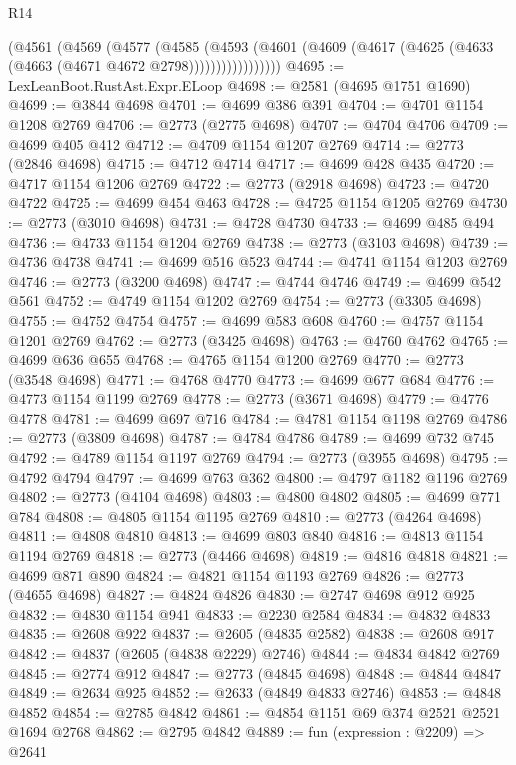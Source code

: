 \begin{lexlean}{R14}
\begin{coremodule}
              (@4561
                (@4569
                  (@4577
                    (@4585
                      (@4593
                        (@4601
                          (@4609 (@4617 (@4625 (@4633 (@4663 (@4671 @4672 @2798)))))))))))))))))
@4695 := LexLeanBoot.RustAst.Expr.ELoop
@4698 := @2581 (@4695 @1751 @1690)
@4699 := @3844 @4698
@4701 := @4699 @386 @391
@4704 := @4701 @1154 @1208 @2769
@4706 := @2773 (@2775 @4698)
@4707 := @4704 @4706
@4709 := @4699 @405 @412
@4712 := @4709 @1154 @1207 @2769
@4714 := @2773 (@2846 @4698)
@4715 := @4712 @4714
@4717 := @4699 @428 @435
@4720 := @4717 @1154 @1206 @2769
@4722 := @2773 (@2918 @4698)
@4723 := @4720 @4722
@4725 := @4699 @454 @463
@4728 := @4725 @1154 @1205 @2769
@4730 := @2773 (@3010 @4698)
@4731 := @4728 @4730
@4733 := @4699 @485 @494
@4736 := @4733 @1154 @1204 @2769
@4738 := @2773 (@3103 @4698)
@4739 := @4736 @4738
@4741 := @4699 @516 @523
@4744 := @4741 @1154 @1203 @2769
@4746 := @2773 (@3200 @4698)
@4747 := @4744 @4746
@4749 := @4699 @542 @561
@4752 := @4749 @1154 @1202 @2769
@4754 := @2773 (@3305 @4698)
@4755 := @4752 @4754
@4757 := @4699 @583 @608
@4760 := @4757 @1154 @1201 @2769
@4762 := @2773 (@3425 @4698)
@4763 := @4760 @4762
@4765 := @4699 @636 @655
@4768 := @4765 @1154 @1200 @2769
@4770 := @2773 (@3548 @4698)
@4771 := @4768 @4770
@4773 := @4699 @677 @684
@4776 := @4773 @1154 @1199 @2769
@4778 := @2773 (@3671 @4698)
@4779 := @4776 @4778
@4781 := @4699 @697 @716
@4784 := @4781 @1154 @1198 @2769
@4786 := @2773 (@3809 @4698)
@4787 := @4784 @4786
@4789 := @4699 @732 @745
@4792 := @4789 @1154 @1197 @2769
@4794 := @2773 (@3955 @4698)
@4795 := @4792 @4794
@4797 := @4699 @763 @362
@4800 := @4797 @1182 @1196 @2769
@4802 := @2773 (@4104 @4698)
@4803 := @4800 @4802
@4805 := @4699 @771 @784
@4808 := @4805 @1154 @1195 @2769
@4810 := @2773 (@4264 @4698)
@4811 := @4808 @4810
@4813 := @4699 @803 @840
@4816 := @4813 @1154 @1194 @2769
@4818 := @2773 (@4466 @4698)
@4819 := @4816 @4818
@4821 := @4699 @871 @890
@4824 := @4821 @1154 @1193 @2769
@4826 := @2773 (@4655 @4698)
@4827 := @4824 @4826
@4830 := @2747 @4698 @912 @925
@4832 := @4830 @1154 @941
@4833 := @2230 @2584
@4834 := @4832 @4833
@4835 := @2608 @922
@4837 := @2605 (@4835 @2582)
@4838 := @2608 @917
@4842 := @4837 (@2605 (@4838 @2229) @2746)
@4844 := @4834 @4842 @2769
@4845 := @2774 @912
@4847 := @2773 (@4845 @4698)
@4848 := @4844 @4847
@4849 := @2634 @925
@4852 := @2633 (@4849 @4833 @2746)
@4853 := @4848 @4852
@4854 := @2785 @4842
@4861 := @4854 @1151 @69 @374 @2521 @2521 @1694 @2768
@4862 := @2795 @4842
@4889 := fun (expression : @2209) =>
  @2641

\end{coremodule}
\end{lexlean}
